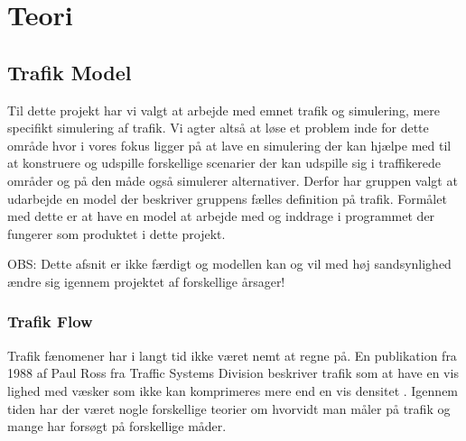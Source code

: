 \chapter{Teori}\label{Teori}

\section{Trafik Model}

Til dette projekt har vi valgt at arbejde med emnet trafik og simulering, mere specifikt simulering af trafik. Vi agter altså at løse et problem inde for dette område hvor i vores fokus ligger på at lave en simulering der kan hjælpe med til at konstruere og udspille forskellige scenarier der kan udspille sig i traffikerede områder og på den måde også simulerer alternativer. Derfor har gruppen valgt at udarbejde en model der beskriver gruppens fælles definition på trafik. Formålet med dette er at have en model at arbejde med og inddrage i programmet der fungerer som produktet i dette projekt.

OBS: Dette afsnit er ikke færdigt og modellen kan og vil med høj sandsynlighed ændre sig igennem projektet af forskellige årsager! 

\subsection{Trafik Flow}

Trafik fænomener har i langt tid ikke været nemt at regne på. En publikation fra 1988 af Paul Ross fra Traffic Systems Division beskriver trafik som at have en vis lighed med væsker som ikke kan komprimeres mere end en vis densitet \cite{trafdyn}. Igennem tiden har der været nogle forskellige teorier om hvorvidt man måler på trafik og mange har forsøgt på forskellige måder. 


